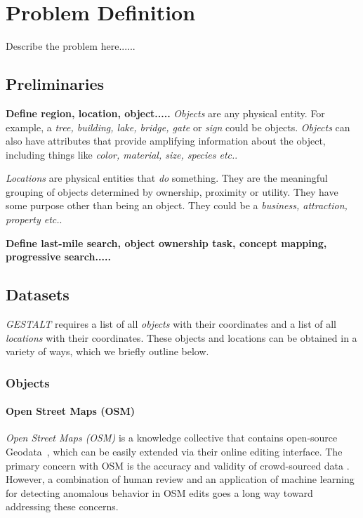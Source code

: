 \section{Problem Definition}
\label{section:problem}

Describe the problem here......

\subsection{Preliminaries}
\textbf{Define region, location, object.....}
\emph{Objects} are any physical entity. For example, a \textit{tree, building, lake, bridge, gate} or \textit{sign} could be objects. \textit{Objects} can also have attributes that provide amplifying information about the object, including things like \textit{color, material, size, species etc.}. 

\emph{Locations} are physical entities that \textit{do} something. They are the meaningful grouping of objects determined by ownership, proximity or utility. They have some purpose other than being an object. They could be a \textit{business, attraction, property etc.}. 

\textbf{Define last-mile search, object ownership task, concept mapping, progressive search.....}


\subsection{Datasets}
\emph{GESTALT} requires a list of all \textit{objects} with their coordinates and a list of all \textit{locations} with their coordinates. These objects and locations can be obtained in a variety of ways, which we briefly outline below. 

\subsubsection{Objects}
\paragraph{Open Street Maps (OSM)}
\textit{Open Street Maps (OSM)} is a knowledge collective that contains open-source Geodata~\cite{Haklay2008}, which can be easily extended via their online editing interface.
The primary concern with OSM is the accuracy and validity of crowd-sourced data \cite{VargasMunoz2020}. However, a combination of human review and an application of machine learning for detecting anomalous behavior in OSM edits \cite{Mooney2017} goes a long way toward addressing these concerns. 

